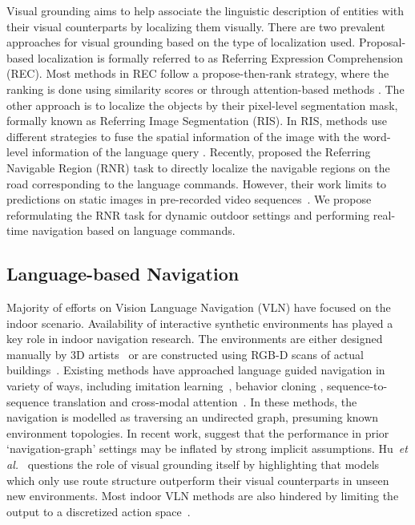 \documentclass[11pt]{article}
\newcommand{\etal}{\textit{et al.}}
\begin{document}
Visual grounding aims to help associate the linguistic description of entities with their visual counterparts by localizing them visually. There are two prevalent approaches for visual grounding based on the type of localization used. Proposal-based localization is formally referred to as Referring Expression Comprehension (REC). Most methods in REC follow a propose-then-rank strategy, where the ranking is done using similarity scores \cite{rohrbach2016grounding, hu2016natural, plummer2018conditional, rufus2020cosine} or through attention-based methods \cite{deng2018visual, zhang2018grounding, yang2019dynamic, qiu2020language}. The other approach is to localize the objects by their pixel-level segmentation mask, formally known as Referring Image Segmentation (RIS). In RIS, methods use different strategies to fuse the spatial information of the image with the word-level information of the language query \cite{shi2018key, ye2019cross, huang2020referring, jain2021comprehensive}. Recently, \cite{Rufus_2021} proposed the Referring Navigable Region (RNR) task to directly localize the navigable regions on the road corresponding to the language commands. However, their work limits to predictions on static images in pre-recorded video sequences~\cite{caesar2020nuscenes}. We propose reformulating the RNR task for dynamic outdoor settings and performing real-time navigation based on language commands.

\subsection{Language-based Navigation}

Majority of efforts on Vision Language Navigation (VLN) have focused on the indoor scenario. Availability of interactive synthetic environments has played a key role in indoor navigation research. The environments are either designed manually by 3D artists~\cite{kolve2017ai2, wu2018building} or are constructed using RGB-D scans of actual buildings~\cite{chang2017matterport3d}. Existing methods have approached language guided navigation in variety of ways, including imitation learning~\cite{nguyen2019vision, nguyen2019help}, behavior cloning \cite{das2018neural}, sequence-to-sequence translation \cite{anderson2018vision} and cross-modal attention~\cite{cornia2019perceive}. In these methods, the navigation is modelled as traversing an undirected graph, presuming known environment topologies. In recent work, \cite{krantz2020beyond} suggest that the performance in prior `navigation-graph' settings may be inflated by strong implicit assumptions. Hu~\etal~\cite{hu2019you} questions the role of visual grounding itself by highlighting that models which only use route structure outperform their visual counterparts in unseen new environments. Most indoor VLN methods are also hindered by limiting the output to a discretized action space~\cite{irshad2021hierarchical}.
\end{document}

